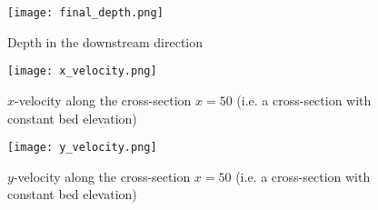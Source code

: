 \begin{figure}
\begin{center}
\texttt{[image: final\_depth.png]}
\caption{Depth in the downstream direction}
\label{fig:depthdownchan}
\end{center}
\end{figure}
 

\begin{figure}
\begin{center}
\texttt{[image: x\_velocity.png]}
\caption{$x$-velocity along the cross-section $x=50$ (i.e. a cross-section with constant bed elevation)}
\label{fig:xvelscrosschan}
\end{center}
\end{figure}

\begin{figure}
\begin{center}
\texttt{[image: y\_velocity.png]}
\caption{$y$-velocity along the cross-section $x=50$ (i.e. a cross-section with constant bed elevation)}
\label{fig:yvelscroschan}
\end{center}
\end{figure}


\endinput
